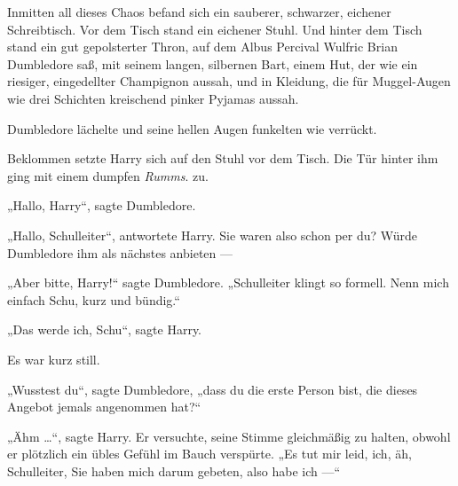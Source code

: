 Inmitten all dieses Chaos befand sich ein sauberer, schwarzer, eichener Schreibtisch. Vor dem Tisch stand ein eichener Stuhl. Und hinter dem Tisch stand ein gut gepolsterter Thron, auf dem Albus Percival Wulfric Brian Dumbledore saß, mit seinem langen, silbernen Bart, einem Hut, der wie ein riesiger, eingedellter Champignon aussah, und in Kleidung, die für Muggel-Augen wie drei Schichten kreischend pinker Pyjamas aussah.

Dumbledore lächelte und seine hellen Augen funkelten wie verrückt.

Beklommen setzte Harry sich auf den Stuhl vor dem Tisch. Die Tür hinter ihm ging mit einem dumpfen \emph{Rumms}. zu.

„Hallo, Harry“, sagte Dumbledore.

„Hallo, Schulleiter“, antwortete Harry. Sie waren also schon per du? Würde Dumbledore ihm als nächstes anbieten —

„Aber bitte, Harry!“ sagte Dumbledore.
„Schulleiter klingt so formell. Nenn mich einfach Schu, kurz und bündig.“

„Das werde ich, Schu“, sagte Harry.

Es war kurz still.

„Wusstest du“, sagte Dumbledore, „dass du die erste Person bist, die dieses Angebot jemals angenommen hat?“

„Ähm …“, sagte Harry. Er versuchte, seine Stimme gleichmäßig zu halten, obwohl er plötzlich ein übles Gefühl im Bauch verspürte.
„Es tut mir leid, ich, äh, Schulleiter, Sie haben mich darum gebeten, also habe ich —“

